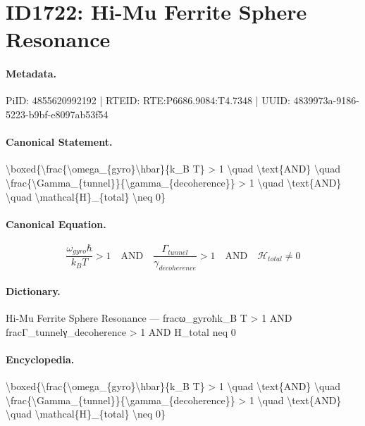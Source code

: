 \section*{ID1722: Hi-Mu Ferrite Sphere Resonance}
\paragraph{Metadata.}
PiID: 4855620992192 | RTEID: RTE:P6686.9084:T4.7348 | UUID: 4839973a-9186-5223-b9bf-e8097ab53f54

\paragraph{Canonical Statement.}
\textbackslash{}boxed\{\textbackslash{}frac\{\textbackslash{}omega\_\{gyro\}\textbackslash{}hbar\}\{k\_B T\} > 1 \textbackslash{}quad \textbackslash{}text\{AND\} \textbackslash{}quad \textbackslash{}frac\{\textbackslash{}Gamma\_\{tunnel\}\}\{\textbackslash{}gamma\_\{decoherence\}\} > 1 \textbackslash{}quad \textbackslash{}text\{AND\} \textbackslash{}quad \textbackslash{}mathcal\{H\}\_\{total\} \textbackslash{}neq 0\}

\paragraph{Canonical Equation.}
\[
\boxed{\frac{\omega_{gyro}\hbar}{k_B T} > 1 \quad \text{AND} \quad \frac{\Gamma_{tunnel}}{\gamma_{decoherence}} > 1 \quad \text{AND} \quad \mathcal{H}_{total} \neq 0}
\]

\paragraph{Dictionary.}
Hi-Mu Ferrite Sphere Resonance — fracω\_gyroħk\_B T > 1 AND fracΓ\_tunnelγ\_decoherence > 1 AND H\_total neq 0

\paragraph{Encyclopedia.}
\textbackslash{}boxed\{\textbackslash{}frac\{\textbackslash{}omega\_\{gyro\}\textbackslash{}hbar\}\{k\_B T\} > 1 \textbackslash{}quad \textbackslash{}text\{AND\} \textbackslash{}quad \textbackslash{}frac\{\textbackslash{}Gamma\_\{tunnel\}\}\{\textbackslash{}gamma\_\{decoherence\}\} > 1 \textbackslash{}quad \textbackslash{}text\{AND\} \textbackslash{}quad \textbackslash{}mathcal\{H\}\_\{total\} \textbackslash{}neq 0\}
